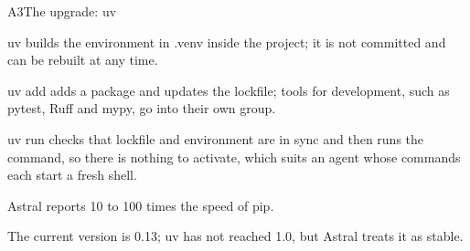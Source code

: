 \begin{frame}[fragile,source={Astral (2026), uv documentation: projects, running commands, lockfile; uv README and its speed benchmark}]{A3\enspace The upgrade: uv}
{    uv builds the environment in .venv inside the project; it is not committed and can be
      rebuilt at any time.\par
    uv add adds a package and updates the lockfile; tools for development, such as pytest, Ruff
      and mypy, go into their own group.\par
    uv run checks that lockfile and environment are in sync and then runs the command, so there
      is nothing to activate, which suits an agent whose commands each start a fresh shell.\par
    Astral reports 10 to 100 times the speed of pip.\par
    The current version is 0.13; uv has not reached 1.0, but Astral treats it as stable.}
\end{frame}


